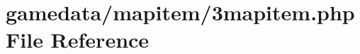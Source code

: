 \hypertarget{3mapitem_8php}{\section{gamedata/mapitem/3mapitem.php File Reference}
\label{3mapitem_8php}
}
